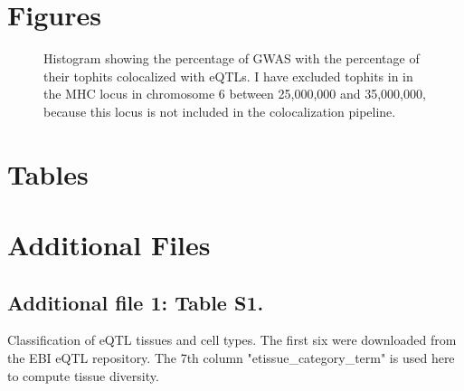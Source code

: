\documentclass[doublespacing,linenumbers]{bmcart}
\begin{document}
\begin{backmatter}


        \section*{Figures}

        \begin{figure}[h!]
            \caption{Histogram showing the percentage of GWAS with the percentage of their tophits colocalized with eQTLs.
            I have excluded tophits in in the MHC locus in chromosome 6 between 25,000,000 and 35,000,000,
                because this locus is not included in the colocalization pipeline.}
            \label{fig:hist_perc_tophits_eqtl_excl_mhc}
        \end{figure}


        \section*{Tables}

        


        \section*{Additional Files}
        \subsection*{Additional file 1: Table S1.}
        Classification of eQTL tissues and cell types. The first six were downloaded from the EBI eQTL repository.
        The 7th column "etissue\_category\_term" is used here to compute tissue diversity.


\end{backmatter}
\end{document}
